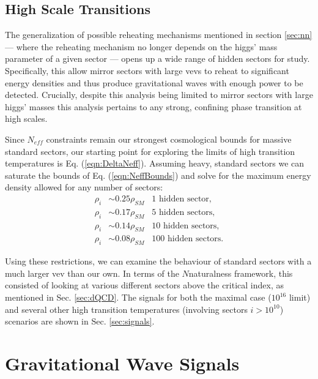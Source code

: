 \documentclass[nofootinbib,twocolumn,preprintnumbers]{revtex4-1}
\begin{document}
\subsection{High Scale Transitions}

The generalization of possible reheating mechanisms mentioned in section \ref{sec:nn} --- where the reheating mechanism no longer depends on the higgs' mass parameter of a given sector --- opens up a wide range of hidden sectors for study. Specifically, this allow mirror sectors with large vevs to reheat to significant energy densities and thus produce gravitational waves with enough power to be detected. Crucially, despite this analysis being limited to mirror sectors with large higgs' masses this analysis pertains to any strong, confining phase transition at high scales.

Since $N_{eff}$ constraints remain our strongest cosmological bounds for massive standard sectors, our starting point for exploring the limits of high transition temperatures is Eq. (\ref{eqn:DeltaNeff}). Assuming heavy, standard sectors we can saturate the bounds of Eq. (\ref{eqn:NeffBounds}) and solve for the maximum energy density allowed for any number of sectors:
\begin{equation}\label{eqn:energyDensityAllowed}
\begin{split}
\rho_i &\sim 0.25 \rho_{SM} \,\,\,\,\, \mathrm{1}\,\, \mathrm{hidden}\,\, \mathrm{sector},
\\
\rho_i &\sim 0.17 \rho_{SM} \,\,\,\,\, \mathrm{5} \,\,\mathrm{hidden}\,\, \mathrm{sectors},
\\
\rho_i &\sim 0.14 \rho_{SM} \,\,\,\,\, \mathrm{10} \,\,\mathrm{hidden}\,\, \mathrm{sectors},
\\
\rho_i &\sim 0.08 \rho_{SM} \,\,\,\,\, \mathrm{100} \,\,\mathrm{hidden}\,\, \mathrm{sectors}.
\end{split}
\end{equation}

Using these restrictions, we can examine the behaviour of standard sectors with a much larger vev than our own. In terms of the $N$naturalness framework, this consisted of looking at various different sectors above the critical index, as mentioned in Sec. \ref{sec:dQCD}. The signals for both the maximal case ($10^{16}$ limit) and several other high transition temperatures (involving sectors $i > 10^{10}$) scenarios are shown in Sec. \ref{sec:signals}. 

\section{Gravitational Wave Signals}
\end{document}
